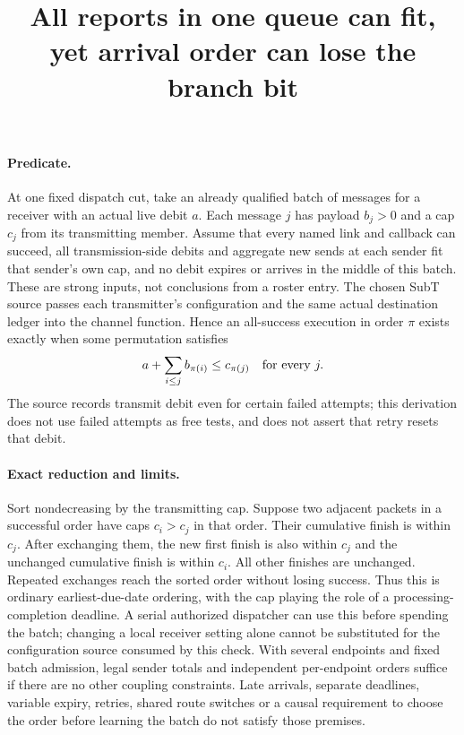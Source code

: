 \documentclass{article}
\begin{document}
\title{All reports in one queue can fit, yet arrival order can lose the branch bit}
\maketitle

\paragraph{Predicate.}
At one fixed dispatch cut, take an already qualified batch of
messages for a receiver with an actual live debit \(a\).
Each message \(j\) has payload \(b_j>0\) and a cap \(c_j\)
from its transmitting member. Assume that every named link
and callback can succeed, all transmission-side debits and
aggregate new sends at each sender fit that sender's own cap,
and no debit expires or arrives in the middle of this batch.
These are strong inputs, not conclusions from a roster entry.
The chosen SubT source passes each transmitter's configuration
and the same actual destination ledger into the channel function.
Hence an all-success execution in order \(\pi\) exists
exactly when some permutation satisfies
\[
 a+\sum_{i\le j} b_{\pi(i)}\le c_{\pi(j)}
 \quad\hbox{for every }j.
\]
The source records transmit debit even for certain failed
attempts; this derivation does not use failed attempts as free
tests, and does not assert that retry resets that debit.

\paragraph{Exact reduction and limits.}
Sort nondecreasing by the transmitting cap. Suppose two
adjacent packets in a successful order have caps \(c_i>c_j\)
in that order. Their cumulative finish is within \(c_j\).
After exchanging them, the new first finish is also within
\(c_j\) and the unchanged cumulative finish is within \(c_i\).
All other finishes are unchanged. Repeated exchanges reach
the sorted order without losing success. Thus this is
ordinary earliest-due-date ordering, with the cap playing
the role of a processing-completion deadline. A serial
authorized dispatcher can use this before spending the
batch; changing a local receiver setting alone cannot be
substituted for the configuration source consumed by this check.
With several endpoints and fixed batch admission, legal sender
totals and independent per-endpoint orders suffice if there
are no other coupling constraints. Late arrivals, separate
deadlines, variable expiry, retries, shared route switches
or a causal requirement to choose the order before learning the
batch do not satisfy those premises.
\end{document}
